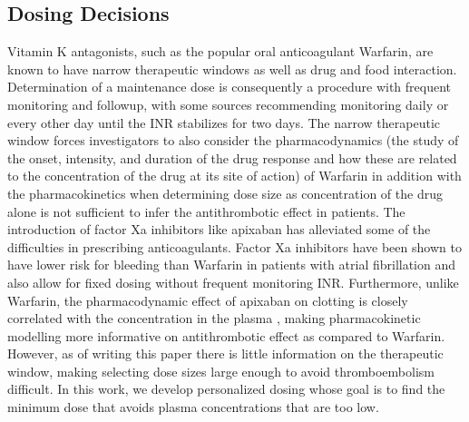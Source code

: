 \subsection*{Dosing Decisions}

Vitamin K antagonists, such as the popular oral anticoagulant Warfarin, are known to have narrow therapeutic windows as well as drug and food interaction. Determination of a maintenance dose is consequently a procedure with frequent monitoring and followup, with some sources recommending monitoring daily or every other day until the INR stabilizes for two days.  The narrow therapeutic window forces investigators to also consider the pharmacodynamics (the study of the onset, intensity, and duration of the drug response and how these are related to the concentration of the drug at its site of action) of Warfarin in addition with the pharmacokinetics when determining dose size as concentration of the drug alone is not sufficient to infer the antithrombotic effect in patients. The introduction of factor Xa inhibitors like apixaban has alleviated some of the difficulties in prescribing anticoagulants.  Factor Xa inhibitors have been shown to have lower risk for bleeding than Warfarin in patients with atrial fibrillation \cite{vinogradova2018risks} and also allow for fixed dosing without frequent monitoring INR. Furthermore, unlike Warfarin, the pharmacodynamic effect of apixaban on clotting is closely correlated with the concentration in the plasma \cite{Byon2019-gf}, making pharmacokinetic modelling more informative on antithrombotic effect as compared to Warfarin.  However, as of writing this paper there is little information on the therapeutic window, making selecting dose sizes large enough to avoid thromboembolism difficult. In this work, we develop personalized dosing whose goal is to find the minimum dose that avoids plasma concentrations that are too low. 

